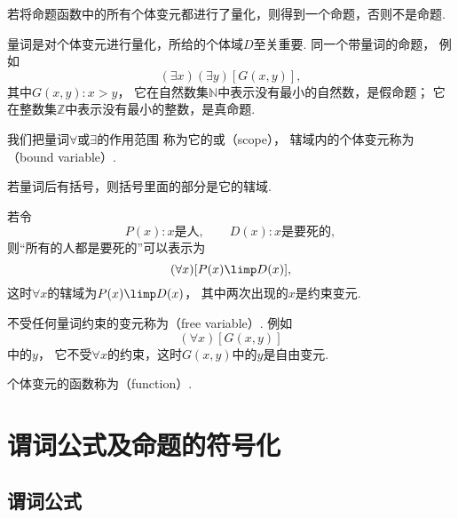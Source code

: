 若将命题函数中的所有个体变元都进行了量化，则得到一个命题，否则不是命题.

量词是对个体变元进行量化，所给的个体域\(D\)至关重要.
同一个带量词的命题，
例如\begin{equation*}
	(\exists x)(\exists y)[G(x,y)],
\end{equation*}
其中\(G(x,y): x>y\)，
它在自然数集\(\mathbb{N}\)中表示没有最小的自然数，是假命题；
它在整数集\(\mathbb{Z}\)中表示没有最小的整数，是真命题.

我们把量词\(\forall\)或\(\exists\)的作用范围
称为它的或（scope），
辖域内的个体变元称为（bound variable）.

若量词后有括号，则括号里面的部分是它的辖域.

若令\begin{equation*}
	P(x):
	\text{$x$是人},
	\qquad
	D(x):
	\text{$x$是要死的},
\end{equation*}
则“所有的人都是要死的”可以表示为\begin{equation*}
	(\forall x)[P(x) \limp D(x)],
\end{equation*}
这时\(\forall x\)的辖域为\(P(x) \limp D(x)\)，
其中两次出现的\(x\)是约束变元.

不受任何量词约束的变元称为（free variable）.
例如\begin{equation*}
	(\forall x)[G(x,y)]
\end{equation*}中的\(y\)，
它不受\(\forall x\)的约束，这时\(G(x,y)\)中的\(y\)是自由变元.

个体变元的函数称为（function）.

\section{谓词公式及命题的符号化}
\subsection{谓词公式}

